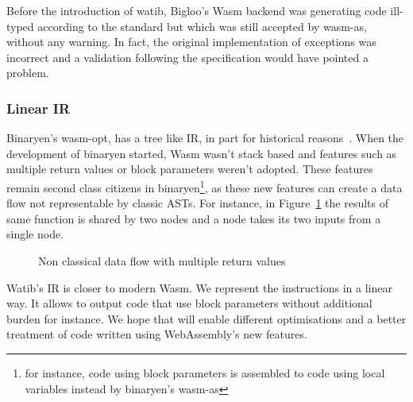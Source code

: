 \documentclass[a4paper,11pt]{article}
\begin{document}
Before the introduction of \textsf{watib}, Bigloo's Wasm backend was generating
code ill-typed according to the standard but which was still accepted by
\textsf{wasm-as}, without any warning. In fact, the original implementation of
exceptions was incorrect and a validation following the specification would have
pointed a problem.

\subsubsection{Linear IR}
Binaryen's \textsf{wasm-opt}, has a tree like IR, in part for historical
reasons~\cite{BinaryenIR}. When the development of binaryen started, Wasm wasn't
stack based and features such as multiple return values or block parameters
weren't adopted. These features remain second class citizens in
binaryen\footnote{for instance, code using block parameters is assembled to code
using local variables instead by binaryen's \textsf{wasm-as}}, as these new
features can create a data flow not representable by classic ASTs. For instance,
in Figure~\ref{data-flow} the results of same function is shared by two nodes
and a node takes its two inputs from a single node.

\begin{figure}[h]
  \centering
  \caption{Non classical data flow with multiple return values}\label{data-flow}
\end{figure}

\textsf{Watib}'s IR is closer to modern Wasm. We represent the instructions in a
linear way. It allows to output code that use block parameters without
additional burden for instance. We hope that will enable different optimisations
and a better treatment of code written using WebAssembly's new features.
\end{document}

